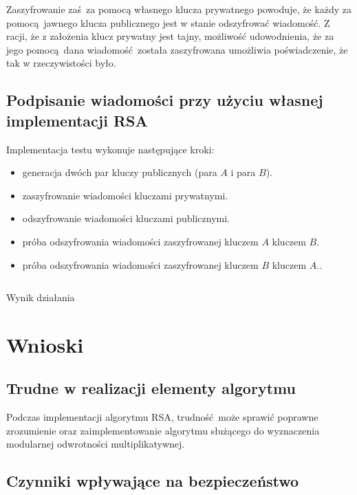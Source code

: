 \documentclass[12pt]{article}
\begin{document}
Zaszyfrowanie zaś za pomocą własnego klucza prywatnego powoduje,
że każdy za pomocą jawnego klucza publicznego jest w stanie
odszyfrować wiadomość.
Z racji, że z założenia klucz prywatny jest tajny,
możliwość udowodnienia, że za jego pomocą dana wiadomość została zaszyfrowana
umożliwia poświadczenie, że tak w rzeczywistości było.

\subsection{Podpisanie wiadomości przy użyciu własnej implementacji RSA}

Implementacja testu wykonuje następujące kroki:

\begin{itemize}
	\item generacja dwóch par kluczy publicznych (para $A$ i para $B$).
	\item zaszyfrowanie wiadomości kluczami prywatnymi.
	\item odszyfrowanie wiadomości kluczami publicznymi.
	\item próba odszyfrowania wiadomości zaszyfrowanej kluczem $A$ kluczem $B$.
	\item próba odszyfrowania wiadomości zaszyfrowanej kluczem $B$ kluczem $A$..
\end{itemize}

\begin{listing}[H]
	\inputminted{yaml}{3-sign.txt}
	\caption{Wynik działania}
\end{listing}

\newpage

\section{Wnioski}

\subsection{Trudne w realizacji elementy algorytmu}

Podczas implementacji algorytmu RSA, trudność może sprawić
poprawne zrozumienie oraz zaimplementowanie algorytmu
służącego do wyznaczenia modularnej odwrotności multiplikatywnej.

\subsection{Czynniki wpływające na bezpieczeństwo}
\end{document}
